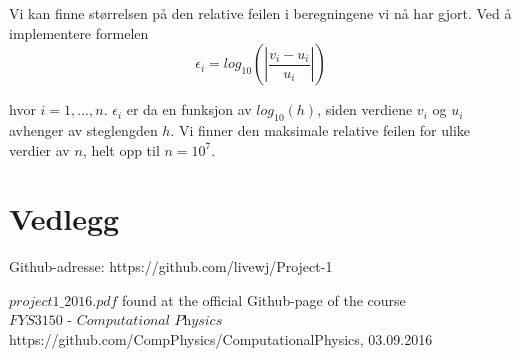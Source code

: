 \documentclass{article}
\begin{document}
Vi kan finne størrelsen på den relative feilen i beregningene vi nå har gjort. Ved å implementere formelen 
\begin{equation}
\epsilon_i = log_{10} \left(\left| \frac{v_i - u_i}{u_i} \right| \right)
\end{equation} 

hvor $i = 1,...,n$. $\epsilon_i$ er da en funksjon av $log_{10}(h)$, siden verdiene $v_i$ og $u_i$ avhenger av steglengden $h$. Vi finner den maksimale relative feilen for ulike verdier av $n$, helt opp til $n=10^7$.


\section{Vedlegg}
Github-adresse: https://github.com/livewj/Project-1

%




\begin{thebibliography}{9}

  $project1\_2016.pdf$
  found at the official Github-page of the course $\textit{FYS3150 - Computational Physics}$
  https://github.com/CompPhysics/ComputationalPhysics,
  03.09.2016
  
    
\end{thebibliography}
\end{document}
